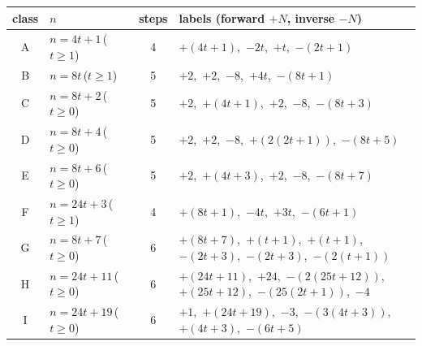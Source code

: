 \begin{tabular}{@{}clcl@{}}
\toprule
class & $n$ & steps & labels (forward $+N$, inverse $-N$) \\ \midrule
A & $n=4t+1$\,($t\ge 1$) & 4 & $+(4 t + 1)$,\ $-2 t$,\ $+t$,\ $-(2 t + 1)$ \\
B & $n=8t$\,($t\ge 1$) & 5 & $+2$,\ $+2$,\ $-8$,\ $+4 t$,\ $-(8 t + 1)$ \\
C & $n=8t+2$\,($t\ge 0$) & 5 & $+2$,\ $+(4 t + 1)$,\ $+2$,\ $-8$,\ $-(8 t + 3)$ \\
D & $n=8t+4$\,($t\ge 0$) & 5 & $+2$,\ $+2$,\ $-8$,\ $+(2 \left(2 t + 1\right))$,\ $-(8 t + 5)$ \\
E & $n=8t+6$\,($t\ge 0$) & 5 & $+2$,\ $+(4 t + 3)$,\ $+2$,\ $-8$,\ $-(8 t + 7)$ \\
F & $n=24t+3$\,($t\ge 1$) & 4 & $+(8 t + 1)$,\ $-4 t$,\ $+3 t$,\ $-(6 t + 1)$ \\
G & $n=8t+7$\,($t\ge 0$) & 6 & $+(8 t + 7)$,\ $+(t + 1)$,\ $+(t + 1)$,\ $-(2 t + 3)$,\ $-(2 t + 3)$,\ $-(2 \left(t + 1\right))$ \\
H & $n=24t+11$\,($t\ge 0$) & 6 & $+(24 t + 11)$,\ $+24$,\ $-(2 \left(25 t + 12\right))$,\ $+(25 t + 12)$,\ $-(25 \left(2 t + 1\right))$,\ $-4$ \\
I & $n=24t+19$\,($t\ge 0$) & 6 & $+1$,\ $+(24 t + 19)$,\ $-3$,\ $-(3 \left(4 t + 3\right))$,\ $+(4 t + 3)$,\ $-(6 t + 5)$ \\
\bottomrule
\end{tabular}

